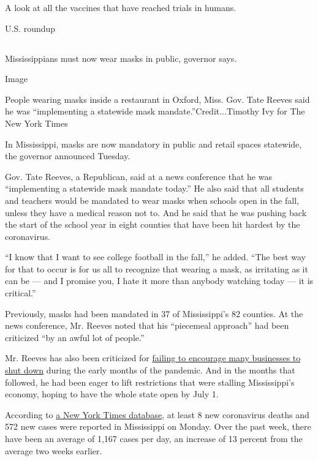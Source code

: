 A look at all the vaccines that have reached trials in humans.

U.S. roundup

\hypertarget{-2}{%
\subsection{}\label{-2}}

Mississippians must now wear masks in public, governor says.

Image

People wearing masks inside a restaurant in Oxford, Miss. Gov. Tate
Reeves said he was ``implementing a statewide mask
mandate.''Credit...Timothy Ivy for The New York Times

In Mississippi, masks are now mandatory in public and retail spaces
statewide, the governor announced Tuesday.

Gov. Tate Reeves, a Republican, said at a news conference that he was
``implementing a statewide mask mandate today.'' He also said that all
students and teachers would be mandated to wear masks when schools open
in the fall, unless they have a medical reason not to. And he said that
he was pushing back the start of the school year in eight counties that
have been hit hardest by the coronavirus.

``I know that I want to see college football in the fall,'' he added.
``The best way for that to occur is for us all to recognize that wearing
a mask, as irritating as it can be --- and I promise you, I hate it more
than anybody watching today --- it is critical.''

Previously, masks had been mandated in 37 of Mississippi's 82 counties.
At the news conference, Mr. Reeves noted that his ``piecemeal approach''
had been criticized ``by an awful lot of people.''

Mr. Reeves has also been criticized for
\href{https://www.nytimes.com/2020/03/26/us/mississippi-coronavirus-essential-businesses-tate-reeves.html}{failing
to encourage many businesses to shut down} during the early months of
the pandemic. And in the months that followed, he had been eager to lift
restrictions that were stalling Mississippi's economy, hoping to have
the whole state open by July 1.

According to
\href{https://www.nytimes.com/interactive/2020/us/mississippi-coronavirus-cases.html}{a
New York Times database}, at least 8 new coronavirus deaths and 572 new
cases were reported in Mississippi on Monday. Over the past week, there
have been an average of 1,167 cases per day, an increase of 13 percent
from the average two weeks earlier.

